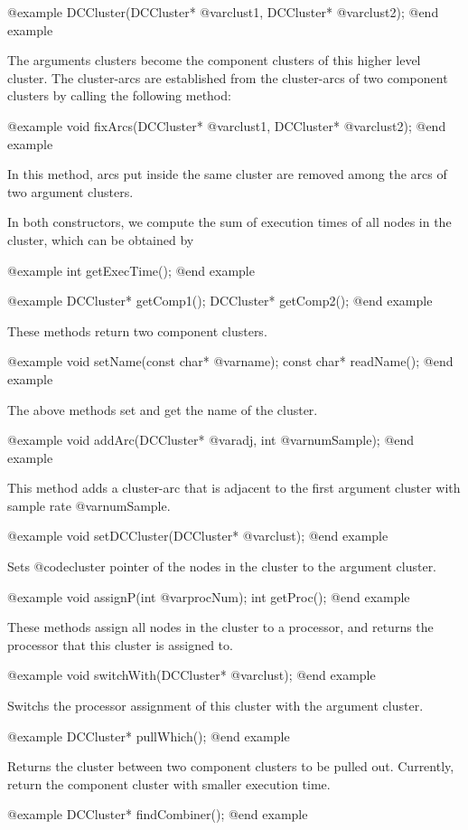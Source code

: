 @example
DCCluster(DCCluster* @var{clust1}, DCCluster* @var{clust2});
@end example

The arguments clusters become the component clusters of this higher level
cluster. The cluster-arcs are established from the cluster-arcs of
two component clusters by calling the following method:

@example
void fixArcs(DCCluster* @var{clust1}, DCCluster* @var{clust2});
@end example

In this method, arcs put inside the same cluster are removed among the arcs
of two argument clusters.

In both constructors, we compute the sum of execution times of all nodes in
the cluster, which can be obtained by

@example
int getExecTime();
@end example

@example
DCCluster* getComp1();
DCCluster* getComp2();
@end example

These methods return two component clusters.

@example
void setName(const char* @var{name});
const char* readName();
@end example

The above methods set and get the name of the cluster.

@example
void addArc(DCCluster* @var{adj}, int @var{numSample});
@end example

This method adds a cluster-arc that is adjacent to the first argument cluster
with sample rate @var{numSample}.

@example
void setDCCluster(DCCluster* @var{clust});
@end example

Sets @code{cluster} pointer of the nodes in the cluster to the argument
cluster.

@example
void assignP(int @var{procNum});
int getProc();
@end example

These methods assign all nodes in the cluster to a processor, and returns
the processor that this cluster is assigned to.

@example
void switchWith(DCCluster* @var{clust});
@end example

Switchs the processor assignment of this cluster with the argument cluster.

@example
DCCluster* pullWhich();
@end example

Returns the cluster between two component clusters to be pulled out. Currently,
return the component cluster with smaller execution time.

@example
DCCluster* findCombiner();
@end example

